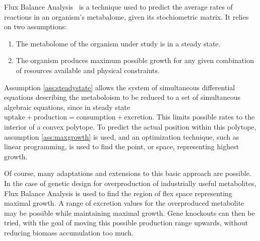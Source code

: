 Flux Balance Analysis~\cite{Orth2010} is a technique used to predict the average rates of reactions in an organism's metabalome, given its stochiometric matrix.
It relies on two assumptions:
\begin{enumerate}
\item \label{ass:steadystate} The metabolome of the organism under study is in a steady state.
\item \label{ass:maxgrowth} The organism produces maximum possible growth for any given combination of resources available and physical constraints.
\end{enumerate}
Assumption \ref{ass:steadystate} allows the system of simultaneous differential equations describing the metaboloism to be reduced to a set of simultaneous algebraic equations, since in steady state \(\text{uptake} + \text{production} = \text{consumption} + \text{excretion}\). 
This limits possible rates to the interior of a convex polytope. 
To predict the actual position within this polytope, assumption \ref{ass:maxgrowth} is used, and an optimization technique, such as linear programming, is used to find the point, or space, representing highest growth.

Of course, many adaptations and extensions to this basic approach are possible. 
In the case of genetic design for overproduction of industrially useful metabolites, Flux Balance Analysis is used to find the region of flex space representing maximal growth. A range of excretion values for the overproduced metabolite may be possible while maintaining maximal growth. Gene knockouts can then be tried, with the goal of moving this possible production range upwards, without reducing biomass accumulation too much.
